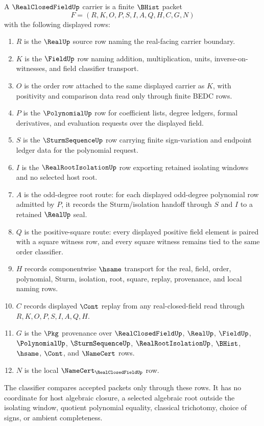 \begin{definition}
\label{def:real-closed-field-carrier}
A $\RealClosedFieldUp$ carrier is a finite $\BHist$ packet
$$
F=(R,K,O,P,S,I,A,Q,H,C,G,N)
$$
with the following displayed rows:
\begin{enumerate}
\item $R$ is the $\RealUp$ source row naming the real-facing carrier boundary.
\item $K$ is the $\FieldUp$ row naming addition, multiplication, units, inverse-on-witnesses, and field classifier transport.
\item $O$ is the order row attached to the same displayed carrier as $K$, with positivity and comparison data read only through finite BEDC rows.
\item $P$ is the $\PolynomialUp$ row for coefficient lists, degree ledgers, formal derivatives, and evaluation requests over the displayed field.
\item $S$ is the $\SturmSequenceUp$ row carrying finite sign-variation and endpoint ledger data for the polynomial request.
\item $I$ is the $\RealRootIsolationUp$ row exporting retained isolating windows and no selected host root.
\item $A$ is the odd-degree root route: for each displayed odd-degree polynomial row admitted by $P$, it records the Sturm/isolation handoff through $S$ and $I$ to a retained $\RealUp$ seal.
\item $Q$ is the positive-square route: every displayed positive field element is paired with a square witness row, and every square witness remains tied to the same order classifier.
\item $H$ records componentwise $\hsame$ transport for the real, field, order, polynomial, Sturm, isolation, root, square, replay, provenance, and local naming rows.
\item $C$ records displayed $\Cont$ replay from any real-closed-field read through $R,K,O,P,S,I,A,Q,H$.
\item $G$ is the $\Pkg$ provenance over $\RealClosedFieldUp$, $\RealUp$, $\FieldUp$, $\PolynomialUp$, $\SturmSequenceUp$, $\RealRootIsolationUp$, $\BHist$, $\hsame$, $\Cont$, and $\NameCert$ rows.
\item $N$ is the local $\NameCert_{\RealClosedFieldUp}$ row.
\end{enumerate}
The classifier compares accepted packets only through these rows. It has no coordinate for host algebraic closure, a selected algebraic root outside the isolating window, quotient polynomial equality, classical trichotomy, choice of signs, or ambient completeness.
\end{definition}

